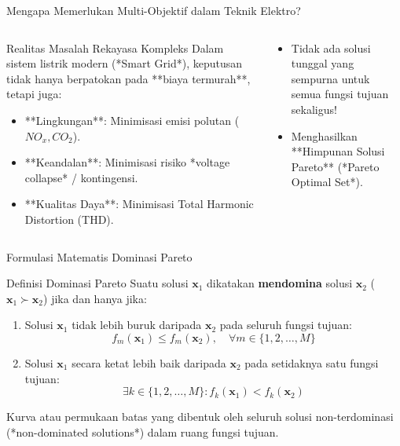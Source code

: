 \documentclass[10pt,aspectratio=169]{beamer}
\begin{document}
\begin{frame}{Mengapa Memerlukan Multi-Objektif dalam Teknik Elektro?}
    \begin{columns}
        \begin{block}{Realitas Masalah Rekayasa Kompleks}
            Dalam sistem listrik modern (*Smart Grid*), keputusan tidak hanya berpatokan pada **biaya termurah**, tetapi juga:
            \begin{itemize}
                \item **Lingkungan**: Minimisasi emisi polutan ($NO_x, CO_2$).
                \item **Keandalan**: Minimisasi risiko *voltage collapse* / kontingensi.
                \item **Kualitas Daya**: Minimisasi Total Harmonic Distortion (THD).
            \end{itemize}
        \end{block}

        \begin{tcolorbox}[colback=unibgold!10,colframe=unibgold!80!black,title=\textbf{Konstruksi Pareto Optimality}]
            \begin{itemize}
                \item Tidak ada solusi tunggal yang sempurna untuk semua fungsi tujuan sekaligus!
                \item Menghasilkan **Himpunan Solusi Pareto** (*Pareto Optimal Set*).
            \end{itemize}
        \end{tcolorbox}
    \end{columns}
\end{frame}

\begin{frame}{Formulasi Matematis Dominasi Pareto}
    \begin{block}{Definisi Dominasi Pareto}
        Suatu solusi $\mathbf{x}_1$ dikatakan \textbf{mendomina} solusi $\mathbf{x}_2$ ($\mathbf{x}_1 \succ \mathbf{x}_2$) jika dan hanya jika:
        \begin{enumerate}
            \item Solusi $\mathbf{x}_1$ tidak lebih buruk daripada $\mathbf{x}_2$ pada seluruh fungsi tujuan:
            \[
                f_m(\mathbf{x}_1) \le f_m(\mathbf{x}_2), \quad \forall m \in \{1, 2, \dots, M\}
            \]
            \item Solusi $\mathbf{x}_1$ secara ketat lebih baik daripada $\mathbf{x}_2$ pada setidaknya satu fungsi tujuan:
            \[
                \exists k \in \{1, 2, \dots, M\} : f_k(\mathbf{x}_1) < f_k(\mathbf{x}_2)
            \]
        \end{enumerate}
    \end{block}

    \begin{tcolorbox}[colback=white,colframe=unibblue,title=\textbf{Pareto Front (Frontier)}]
        Kurva atau permukaan batas yang dibentuk oleh seluruh solusi non-terdominasi (*non-dominated solutions*) dalam ruang fungsi tujuan.
    \end{tcolorbox}
\end{frame}
\end{document}
